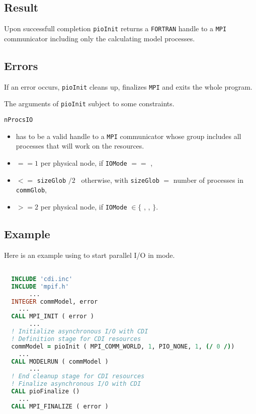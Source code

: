 \subsection*{Result}
Upon successfull completion {\tt pioInit} returns a {\tt FORTRAN} handle to a 
{\tt MPI} communicator including only the calculating model processes.

\subsection*{Errors}
If an error occurs, {\tt pioInit} cleans up, finalizes {\tt MPI} and exits the 
whole program.

\smallskip

The arguments of {\tt pioInit} subject to some constraints. 
\smallskip

\hspace*{4mm}\begin{minipage}[]{15cm}
\begin{deflist}{\tt nProcsIO\ }
\item[{\tt commGlob}]
\begin{itemize}
\item[]
has to be a valid handle to a {\tt MPI} communicator whose group 
includes all processes that will work on the {\CDI} resources.
\end{itemize}
\item[{\tt nProcsIO}]
\begin{itemize}
\item[]$==1$ per physical node, if {\tt IOMode} $==$ 
{},
\item[]$<=$ {\tt sizeGlob} $/ 2$ \ otherwise, with {\tt sizeGlob} $=$ number 
of processes in {\tt commGlob},
\item[]$>= 2$ per physical node, if {\tt IOMode} $\in \{$ 
{}, 
{}, 
{}$\}$.
\end{itemize} 
\end{deflist}
\end{minipage} 

\subsection*{Example}
Here is an example using {} to start parallel I/O 
in {} mode.

\begin{lstlisting}[language=Fortran, backgroundcolor=\color{zebg}, 
basicstyle=\footnotesize, label=control]

  INCLUDE 'cdi.inc'
  INCLUDE 'mpif.h'
       ...
  INTEGER commModel, error
	...
  CALL MPI_INIT ( error )
       ...
  ! Initialize asynchronous I/O with CDI
  ! Definition stage for CDI resources
  commModel = pioInit ( MPI_COMM_WORLD, 1, PIO_NONE, 1, (/ 0 /))
	...
  CALL MODELRUN ( commModel )
       ...
  ! End cleanup stage for CDI resources
  ! Finalize asynchronous I/O with CDI
  CALL pioFinalize ()
	...
  CALL MPI_FINALIZE ( error )

\end{lstlisting}

